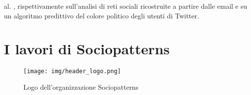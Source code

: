 \documentclass[12pt,twoside]{report}
\begin{document}
al.\cite{inproceedings} , rispettivamente sull'analisi di reti sociali ricostruite a partire dalle email e su un algoritmo predittivo del colore politico degli utenti di Twitter.
	
	
	
	 
	
    
	    
	    
	    
	        
	   
    
    
    
        
    
    
    \section{I lavori di Sociopatterns}
    
    \begin{figure}[h]
	    \centering
	    \texttt{[image: img/header\_logo.png]}
	    \caption{Logo dell'organizzazione Sociopatterns}
	    \label{fig:my_label}
	\end{figure}
    
\end{document}
